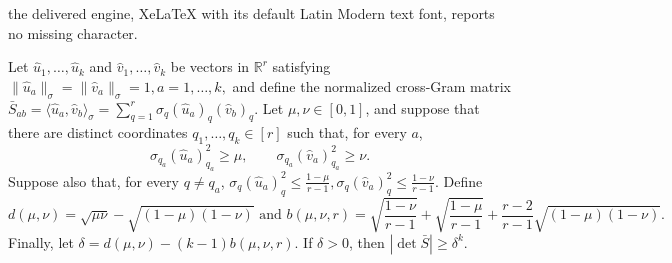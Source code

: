\documentclass[10pt,a4paper]{amsart}
\newcommand{\R}{\mathbb{R}}
\newcommand{\inner}[1]{\langle #1\rangle}
\begin{document}
the delivered engine, XeLaTeX with its default Latin Modern text font, reports no missing character.
\begin{lemma}\label{lem:denom_lower_bound}
Let $\widehat u_1,\ldots,\widehat u_k$ and
$\widehat v_1,\ldots,\widehat v_k$ be vectors in $\R^r$ satisfying
\(
    \|\widehat u_a\|_\sigma
    =
    \|\widehat v_a\|_\sigma
    =
    1,
     a=1,\ldots,k,
\)
and define the normalized cross-Gram matrix
\(
    \bar S_{ab}
    =
    \inner{\widehat u_a,\widehat v_b}_\sigma
    =
    \sum_{q=1}^r
    \sigma_q(\widehat u_a)_q(\widehat v_b)_q.
\)
Let $\mu,\nu\in[0,1]$, and suppose that there are distinct coordinates
$q_1,\ldots,q_k\in[r]$ such that, for every $a$,
\[
    \sigma_{q_a}(\widehat u_a)_{q_a}^2
    \geq \mu,
    \qquad
    \sigma_{q_a}(\widehat v_a)_{q_a}^2
    \geq \nu.
\]
Suppose also that, for every $q\neq q_a$,
\(\sigma_q(\widehat u_a)_q^2  \leq  \frac{1-\mu}{r-1},    \sigma_q(\widehat v_a)_q^2 \leq\frac{1-\nu}{r-1}.\)
Define
\[
    d(\mu,\nu)
    =
    \sqrt{\mu\nu}
    -
    \sqrt{(1-\mu)(1-\nu)}
\text{~and~}
    b(\mu,\nu,r)
    =
    \sqrt{\frac{1-\nu}{r-1}}
    +
    \sqrt{\frac{1-\mu}{r-1}} +
    \frac{r-2}{r-1}
    \sqrt{(1-\mu)(1-\nu)}.
\]
Finally, let
\(
    \delta
    =
    d(\mu,\nu)
    -
    (k-1)b(\mu,\nu,r).
\)
If $\delta>0$, then \(|\det\bar S|\geq\delta^k.\)
\end{lemma}
\end{document}
